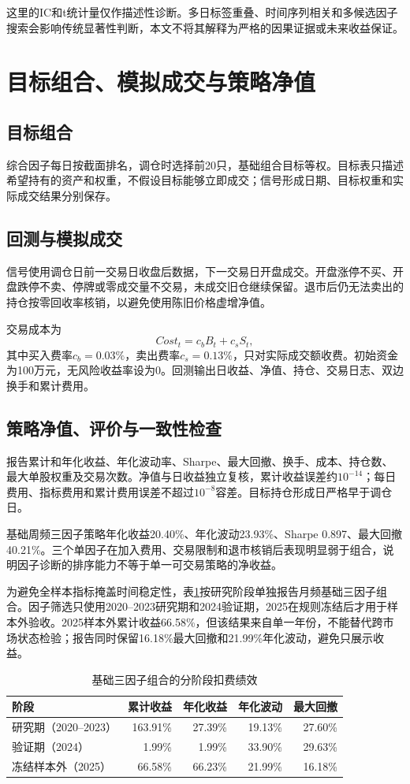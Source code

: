 \documentclass[10.5pt,a4paper]{ctexart}
\begin{document}
这里的IC和t统计量仅作描述性诊断。多日标签重叠、时间序列相关和多候选因子搜索会影响传统显著性判断，本文不将其解释为严格的因果证据或未来收益保证。

\section{目标组合、模拟成交与策略净值}
\subsection{目标组合}
综合因子每日按截面排名，调仓时选择前20只，基础组合目标等权。目标表只描述希望持有的资产和权重，不假设目标能够立即成交；信号形成日期、目标权重和实际成交结果分别保存。

\subsection{回测与模拟成交}
信号使用调仓日前一交易日收盘后数据，下一交易日开盘成交。开盘涨停不买、开盘跌停不卖、停牌或零成交量不交易，未成交旧仓继续保留。退市后仍无法卖出的持仓按零回收率核销，以避免使用陈旧价格虚增净值。

交易成本为
\[
Cost_t=c_bB_t+c_sS_t,
\]
其中买入费率$c_b=0.03\%$，卖出费率$c_s=0.13\%$，只对实际成交额收费。初始资金为100万元，无风险收益率设为0。回测输出日收益、净值、持仓、交易日志、双边换手和累计费用。

\subsection{策略净值、评价与一致性检查}
报告累计和年化收益、年化波动率、Sharpe、最大回撤、换手、成本、持仓数、最大单股权重及交易次数。净值与日收益独立复核，累计收益误差约$10^{-14}$；每日费用、指标费用和累计费用误差不超过$10^{-8}$容差。目标持仓形成日严格早于调仓日。

基础周频三因子策略年化收益20.40\%、年化波动23.93\%、Sharpe 0.897、最大回撤40.21\%。三个单因子在加入费用、交易限制和退市核销后表现明显弱于组合，说明因子诊断的排序能力不等于单一可交易策略的净收益。

为避免全样本指标掩盖时间稳定性，表\ref{tab:period-performance}按研究阶段单独报告月频基础三因子组合。因子筛选只使用2020--2023研究期和2024验证期，2025在规则冻结后才用于样本外验收。2025样本外累计收益66.58\%，但该结果来自单一年份，不能替代跨市场状态检验；报告同时保留16.18\%最大回撤和21.99\%年化波动，避免只展示收益。

\begin{table}[H]\centering\small
\caption{基础三因子组合的分阶段扣费绩效}\label{tab:period-performance}
\begin{tabular}{lrrrr}
\toprule 阶段 & 累计收益 & 年化收益 & 年化波动 & 最大回撤\\\midrule
研究期（2020--2023） & 163.91\% & 27.39\% & 19.13\% & 27.60\%\\
验证期（2024） & 1.99\% & 1.99\% & 33.90\% & 29.63\%\\
冻结样本外（2025） & 66.58\% & 66.23\% & 21.99\% & 16.18\%\\\bottomrule
\end{tabular}
\end{table}
\end{document}

